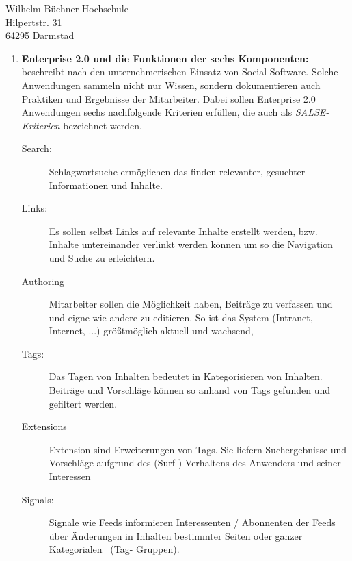 \documentclass[
    version=last,           %
    DIV=13,                 %
    BCOR=0mm,               %
    paper=a4,               %
    fontsize=12pt,          %
    firsthead=on,           %
    firstfoot=on,           %
    pagenumber=on,i         %
    parskip=half,           %
    enlargefirstpage=,      %
    firsthead=on,           %
    fromrule=afteraddress,  %
    priority=off,           %
    backaddress=true,       %
    refline=dateright,      %
	fromalign=right,	    %
    fromemail=on,i          %
    fromurl=on,             %
    frombank=on,
    fromphone=on,           %
    frommobilephone=on      %
    fromlogo=on,            %
    addrfield=on,           %
    subject=untitled,  %
    foldmarks=off,          %
    numericaldate=off,      %
	pagenumber=right,	        %
	parskip=half,	        %
    headsep=false,          %
    footsepline=true,       %
    foldmarks=off,		    %
	]{scrlttr2}
\begin{document}
\begin{letter} {Wilhelm Büchner Hochschule \\
Hilpertstr. 31\\
64295 Darmstad}
\begin{itemize}
\begin{enumerate}
        Bei der Rückwärtsinterpretation ist die Arbeitsaufgabe (W) Ausgangspunkt,
        welche kooperativ und arbeitsteilig durchgeführt wird (C) und
        Unterstützung durch Technologie erfährt (C). Der Fokus liegt auf der
        Aufgabe, nicht auf der eingesetzten Technologie. \\

        Das 3-K Modell beschreibt dabei die Art der unterstützten Interaktion
        zwischen den Teammitgliedern durch die Technik (C) und kann auf Basis
        von Kommunikation, Koordination oder Kooperation erfolgen. Die
        eingesetzten, unterstützenden Technologien lassen sich in Systemklassen
        einteilen; wie \textit{Kommunikation, gemeinsame Informationsräume,
        Workflow Management} oder \textit{Workgroup Computing}.
            \vspace{1cm}
        \item \textbf{Enterprise 2.0 und die Funktionen der sechs Komponenten:}
            beschreibt nach den unternehmerischen
            Einsatz von Social Software. Solche Anwendungen sammeln nicht nur
            Wissen, sondern dokumentieren auch Praktiken und Ergebnisse der
            Mitarbeiter. Dabei sollen Enterprise 2.0 Anwendungen sechs
            nachfolgende Kriterien erfüllen, die auch als \textit{SALSE-Kriterien}
            bezeichnet werden.

            \begin{description}
            \item[Search:] Schlagwortsuche ermöglichen das finden relevanter,
                gesuchter Informationen und Inhalte.
            \item[Links:] Es sollen selbst Links auf relevante Inhalte erstellt
                werden, bzw. Inhalte untereinander verlinkt werden können um so
                die Navigation und Suche zu erleichtern.
                \item[Authoring] Mitarbeiter sollen die Möglichkeit haben, Beiträge
                    zu verfassen und und eigne wie andere zu editieren. So ist
                    das System (Intranet, Internet, ...) größtmöglich aktuell
                    und wachsend,
                \item[Tags:] Das Tagen von Inhalten bedeutet in Kategorisieren
                    von Inhalten. Beiträge und Vorschläge können so anhand von
                    Tags gefunden und gefiltert werden.
                \item[Extensions]
                    Extension sind Erweiterungen von Tags. Sie liefern
                    Suchergebnisse und Vorschläge aufgrund des (Surf-) Verhaltens
                    des Anwenders und seiner Interessen
                \item[Signals:] Signale wie Feeds informieren Interessenten /
                    Abonnenten der Feeds über Änderungen in Inhalten bestimmter
                    Seiten oder ganzer Kategorialen \ (Tag- Gruppen).
            \end{description}


\end{enumerate}
\end{itemize}
\end{letter}
\end{document}
